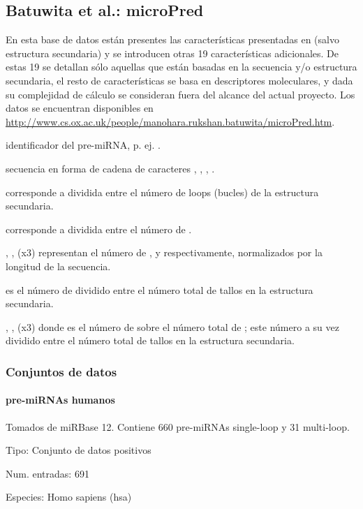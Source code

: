 \documentclass[12pt,bibliography=openstyle,DIV=12,parskip=half-]{scrartcl}
\begin{document}
\subsection{Batuwita et al.: microPred}
En esta base de datos están presentes las características presentadas
en \cite{ng} (salvo estructura secundaria) y se introducen otras 19 
características adicionales. De estas 19 se detallan sólo aquellas que están
basadas en la secuencia y/o estructura secundaria, el resto de características
se basa en descriptores moleculares, y dada su complejidad de cálculo
se consideran fuera del alcance del actual proyecto.
%
Los datos se encuentran disponibles en \url{http://www.cs.ox.ac.uk/people/manohara.rukshan.batuwita/microPred.htm}.
%
\begin{description*}
%
\item[identificador] del pre-miRNA, p. ej. .
%
\item[secuencia] en forma de cadena de caracteres , ,
  , .
%
\item[\mono{MFEI$_3$}] corresponde a  dividida entre el número
  de loops (bucles) de la estructura secundaria.
%
\item[\mono{MFEI$_4$}] corresponde a  dividida entre el número
  de .
%
\item[\mono{|A-U|/L}, \mono{|G-C|/L}, \mono{|G-U|/L}] (x3) representan
  el número de  ,  y 
  respectivamente, normalizados por la longitud de la secuencia.
%
\item[\mono{Avg\_BP\_Stem}] es el número de  dividido
  entre el número total de tallos en la estructura secundaria.
%
\item[\mono{\%(A-U)/n\_stems}, \mono{\%(G-C)/n\_stems},
  \mono{\%(G-U)/n\_stems}] (x3) donde  es el número de
    sobre el número total de
  ; este número a su vez dividido entre el número
  total de tallos en la estructura secundaria.
\end{description*}
%
%
\subsubsection{Conjuntos de datos}
\paragraph{pre-miRNAs humanos}
Tomados de miRBase 12. Contiene 660 pre-miRNAs single-loop y 31 multi-loop.
\begin{description*}
\item[Tipo:] Conjunto de datos positivos
\item[Num. entradas:] 691
\item[Especies:] Homo sapiens (hsa)
\end{description*}
%
\end{document}
